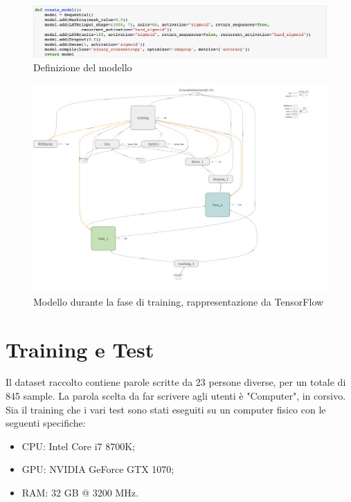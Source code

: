 \documentclass[8pt,notitlepage]{report}
\begin{document}
	
			\begin{figure}
				\begin{center}
					\includegraphics[scale=.45]{def_model}
					\caption{Definizione del modello}
					\label{fig:model}
				\end{center}
			\end{figure}					
					
			\begin{figure}
				\begin{center}
					\includegraphics[scale=.23]{lstm_model}
					\caption{Modello durante la fase di training, rappresentazione da TensorFlow}
				\end{center}
			\end{figure}		
		


\chapter{Training e Test}
	Il dataset raccolto contiene parole scritte da 23 persone diverse, per un totale di 845 sample. La parola scelta da far scrivere agli utenti è "Computer", in corsivo. \\
	Sia il training che i vari test sono stati eseguiti su un computer fisico con le seguenti specifiche:
	\begin{itemize}
		\item CPU: Intel Core i7 8700K;
		\item GPU: NVIDIA GeForce GTX 1070;
		\item RAM: 32 GB @ 3200 MHz.
	\end{itemize}
	
\end{document}

